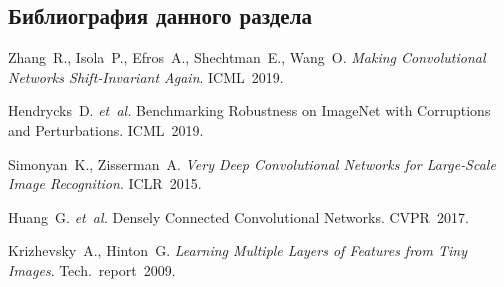 \subsection*{Библиография данного раздела}
\begin{enumerate*}[label={\arabic*.}]
  \item Zhang R., Isola P., Efros A., Shechtman E., Wang O. \textit{Making Convolutional Networks Shift‑Invariant Again}. ICML 2019.
  \item Hendrycks D. \textit{et al.} Benchmarking Robustness on ImageNet with Corruptions and Perturbations. ICML 2019.
  \item Simonyan K., Zisserman A. \textit{Very Deep Convolutional Networks for Large‑Scale Image Recognition}. ICLR 2015.
  \item Huang G. \textit{et al.} Densely Connected Convolutional Networks. CVPR 2017.
  \item Krizhevsky A., Hinton G. \textit{Learning Multiple Layers of Features from Tiny Images}. Tech. report 2009.
\end{enumerate*}

